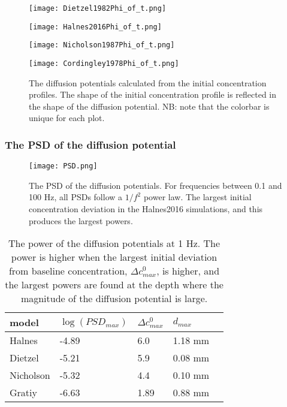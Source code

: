 \documentclass{article}
\begin{document}
\begin{figure}[!tbp]
  \centering
  \begin{minipage}[b]{0.45\textwidth}
    \texttt{[image: Dietzel1982Phi\_of\_t.png]}
  \end{minipage}
  \hfill
  \begin{minipage}[b]{0.45\textwidth}
    \texttt{[image: Halnes2016Phi\_of\_t.png]}
  \end{minipage}
    \begin{minipage}[b]{0.45\textwidth}
    \texttt{[image: Nicholson1987Phi\_of\_t.png]}
  \end{minipage}
  \hfill
  \begin{minipage}[b]{0.45\textwidth}
    \texttt{[image: Cordingley1978Phi\_of\_t.png]}
  \end{minipage}
  \caption{The diffusion potentials calculated from the initial concentration profiles. The shape of the initial concentration profile is reflected in the shape of the diffusion potential. NB: note that the colorbar is unique for each plot.}
  \label{fig:contours}
\end{figure} 









\subsubsection{The PSD of the diffusion potential}\label{calculated PSDs}

\begin{figure}
  \texttt{[image: PSD.png]}
  \caption{The PSD of the diffusion potentials. For frequencies between 0.1 and 100 Hz, all PSDs follow a $1/f^2$ power law. The largest initial concentration deviation in the Halnes2016 simulations, and this produces the largest powers.}
  \label{fig:PSD}
\end{figure}


\begin{table}[h!]
  \centering
  \caption{The power of the diffusion potentials at 1 Hz. The power is higher when the largest initial deviation from baseline concentration, $\Delta c^0_{max}$, is higher, and the largest powers are found at the depth where the magnitude of the diffusion potential is large.}
  \label{tab:psd_magnitude}
  \begin{tabular}{l||l|l|l|l}
model & $\log (PSD_{max})$ & $\Delta c^0_{max}$ & $d_{max}$ \\
\hline
Halnes & -4.89 & 6.0  & 1.18 mm\\
Dietzel & -5.21 & 5.9 & 0.08 mm \\
Nicholson & -5.32 & 4.4 & 0.10 mm \\
Gratiy &-6.63 & 1.89 & 0.88 mm \\
 \end{tabular}
\end{table}
\end{document}
